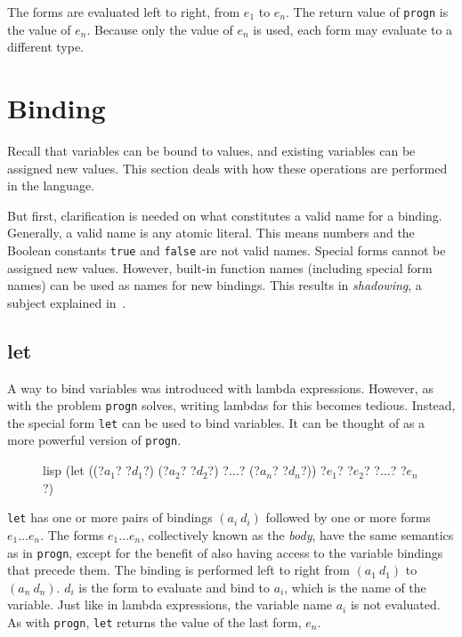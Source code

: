 \documentclass[a4paper, 12pt]{article}
\begin{document}
The forms are evaluated left to right, from $e_1$ to $e_n$. The return value of \texttt{progn} is the value of $e_n$. Because only the value of $e_n$ is used, each form may evaluate to a different type.

\section{Binding}\label{subsec:bindingassign}
Recall that variables can be bound to values, and existing variables can be assigned new values. This section deals with how these operations are performed in the language.

But first, clarification is needed on what constitutes a valid name for a binding. Generally, a valid name is any atomic literal. This means numbers and the Boolean constants \texttt{true} and \texttt{false} are not valid names. Special forms cannot be assigned new values. However, built-in function names (including special form names) can be used as names for new bindings. This results in \textit{shadowing}, a subject explained in~.

\subsection{let}
A way to bind variables was introduced with lambda expressions. However, as with the problem \texttt{progn} solves, writing lambdas for this becomes tedious. Instead, the special form \texttt{let} can be used to bind variables. It can be thought of as a more powerful version of \texttt{progn}.

\begin{figure}[htp]
    \centering
    \begin{cminted}[autogobble=true, escapeinside=??]{lisp}
        (let ((?$a_1$? ?$d_1$?) (?$a_2$? ?$d_2$?) ?$\ldots$? (?$a_n$? ?$d_n$?)) ?$e_1$? ?$e_2$? ?$\ldots$? ?$e_n$?)
    \end{cminted}
    \captionsetup[figure]{font=small}
\end{figure}

\texttt{let} has one or more pairs of bindings $(a_i\ d_i)$ followed by one or more forms $e_1 \ldots e_n$. The forms $e_1 \ldots e_n$, collectively known as the \textit{body}, have the same semantics as in \texttt{progn}, except for the benefit of also having access to the variable bindings that precede them. The binding is performed left to right from $(a_1\ d_1)$ to $(a_n\ d_n)$. $d_i$ is the form to evaluate and bind to $a_i$, which is the name of the variable. Just like in lambda expressions, the variable name $a_i$ is not evaluated. As with \texttt{progn}, \texttt{let} returns the value of the last form, $e_n$.
\end{document}
